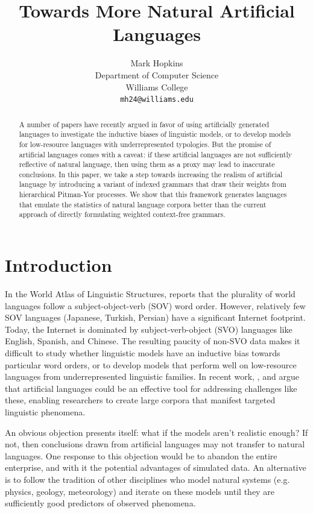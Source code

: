 \documentclass[11pt]{article}
\title{Towards More Natural Artificial Languages}
\author{Mark Hopkins \\
  Department of Computer Science \\
  Williams College \\
  \texttt{mh24@williams.edu} \\}
\begin{document}
\maketitle
\begin{abstract}
A number of papers have recently argued in favor of using artificially generated languages to investigate the inductive biases of linguistic models, or to develop models for low-resource languages with underrepresented typologies. But the promise of artificial languages comes with a caveat: if these artificial languages are not sufficiently reflective of natural language, then using them as a proxy may lead to inaccurate conclusions. In this paper, we take a step towards increasing the realism of artificial language by introducing a variant of indexed grammars that draw their weights from hierarchical Pitman-Yor processes. We show that this framework generates languages that emulate the statistics of natural language corpora better than the current approach of directly formulating weighted context-free grammars. 
\end{abstract}

\section{Introduction}

In the World Atlas of Linguistic Structures, \citet{wals81} reports that the plurality of world languages follow a subject-object-verb (SOV) word order. However, relatively few SOV languages (Japanese, Turkish, Persian) have a significant Internet footprint. Today, the Internet is dominated by subject-verb-object (SVO) languages like English, Spanish, and Chinese. The resulting paucity of non-SVO data makes it difficult to study whether linguistic models have an inductive bias towards particular word orders, or to develop models that perform well on low-resource languages from underrepresented linguistic families. In recent work, \citet{wang-eisner-2016-galactic}, \citet{ravfogel-etal-2019-studying} and \citet{white-cotterell-2021-examining} argue that artificial languages could be an effective tool for addressing challenges like these, enabling researchers to create large corpora that manifest targeted linguistic phenomena.

An obvious objection presents itself: what if the models aren't realistic enough? If not, then conclusions drawn from artificial languages may not transfer to natural languages. One response to this objection would be to abandon the entire enterprise, and with it the potential advantages of simulated data. An alternative is to follow the tradition of other disciplines who model natural systems (e.g. physics, geology, meteorology) and iterate on these models until they are sufficiently good predictors of observed phenomena.
\end{document}
